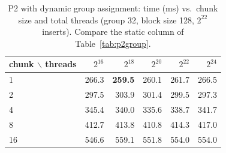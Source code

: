 \begin{table}[H]\centering\small
\caption{P2 with dynamic group assignment: time (ms) vs.\ chunk size and total threads (group 32, block size 128, $2^{22}$ inserts). Compare the static column of Table~\ref{tab:p2group}.}\label{tab:p2dynchunk}
\begin{tabular}{lrrrrr}
\toprule
chunk $\backslash$ threads & $2^{16}$ & $2^{18}$ & $2^{20}$ & $2^{22}$ & $2^{24}$ \\
\midrule
1 & 266.3 & \textbf{259.5} & 260.1 & 261.7 & 266.5 \\
2 & 297.5 & 303.9 & 301.4 & 299.5 & 297.3 \\
4 & 345.4 & 340.0 & 335.6 & 338.7 & 341.7 \\
8 & 412.7 & 413.8 & 410.8 & 414.3 & 417.0 \\
16 & 546.6 & 559.1 & 551.8 & 554.0 & 554.0 \\
\bottomrule
\end{tabular}
\end{table}
